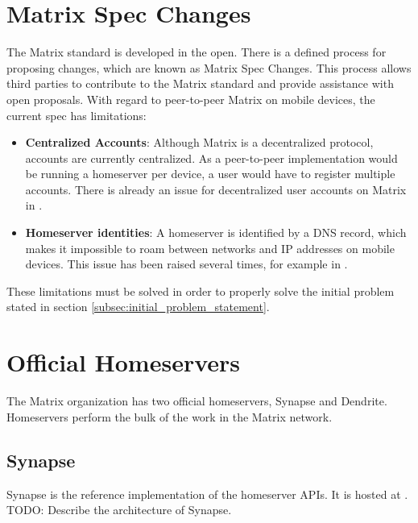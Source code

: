 \section{Matrix Spec Changes}
The Matrix standard is developed in the open.
There is a defined process for proposing changes, which are known as Matrix Spec Changes\cite{matrix_org_spec_changes}.
This process allows third parties to contribute to the Matrix standard and provide assistance with open proposals.
With regard to peer-to-peer Matrix on mobile devices, the current spec has limitations:
\begin{itemize}
    \item{
        \textbf{Centralized Accounts}: 
        Although Matrix is a decentralized protocol, accounts are currently centralized.
        As a peer-to-peer implementation would be running a homeserver per device, a user would have to register multiple accounts.
        There is already an issue for decentralized user accounts on Matrix in .
    }
    \item{
        \textbf{Homeserver identities}:
        A homeserver is identified by a DNS record, which makes it impossible to roam between networks and IP addresses on mobile devices.
        This issue has been raised several times, for example in .
    }
\end{itemize}
These limitations must be solved in order to properly solve the initial problem stated in section \ref{subsec:initial_problem_statement}.

\section{Official Homeservers}
The Matrix organization has two official homeservers, Synapse\cite{matrix_org_synapse} and Dendrite\cite{matrix_org_dendrite}.
Homeservers perform the bulk of the work in the Matrix network.

\subsection{Synapse}
Synapse is the reference implementation of the homeserver \ac{API}s.
It is hosted at .
TODO:
    Describe the architecture of Synapse.

